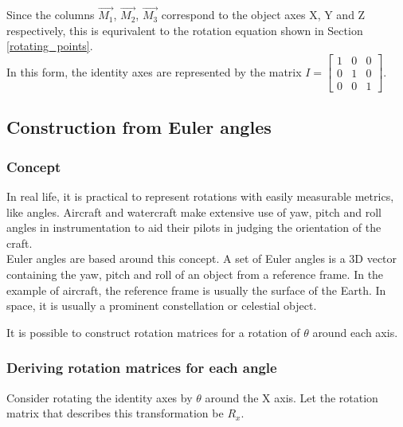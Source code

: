 \documentclass[12pt, a4paper]{article}
\begin{document}
Since the columns $\vec{M_1}$, $\vec{M_2}$, $\vec{M_3}$ correspond to the object
axes X, Y and Z respectively, this is equrivalent to the rotation equation shown
in Section \ref{rotating_points}. \\

In this form, the identity axes are represented by the matrix $I = \begin{bmatrix}
    1 & 0 & 0 \\
    0 & 1 & 0 \\
    0 & 0 & 1
\end{bmatrix}$.

    

\subsection{Construction from Euler angles}

\subsubsection{Concept}
In real life, it is practical to represent rotations with easily measurable
metrics, like angles. Aircraft and watercraft make extensive use of yaw, pitch
and roll angles in instrumentation to aid their pilots in judging the orientation
of the craft. \\

Euler angles are based around this concept. A set of Euler angles is a 3D vector
containing the yaw, pitch and roll of an object from a reference frame. In the
example of aircraft, the reference frame is usually the surface of the Earth. In
space, it is usually a prominent constellation or celestial object.

It is possible to construct rotation matrices for a rotation of $\theta$ around
each axis.

\subsubsection{Deriving rotation matrices for each angle}
Consider rotating the identity axes by $\theta$ around the X axis. Let the
rotation matrix that describes this transformation be $R_x$. \\

\end{document}
